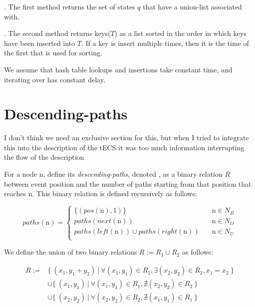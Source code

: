 . The first method returns the set of states $q$ that have a union-list associated with.

. The second method returns keys($T$) as a list sorted in the order in which keys have been inserted into $T$. If a key is insert multiple times, then it is the time of the first that is used for sorting.

We assume that hash table lookups and insertions take constant time, and iterating over has constant delay.

{\color{Added}
\section{Descending-paths}\label{sec:desc-path}

{\color{Comment} I don't think we need an exclusive section for this, but when I tried to integrate this into the description of the tECS it was too much information interrupting the flow of the description}

For a node \textrm{n}, define its \emph{descending-paths}, denoted , as a binary relation $R$ between event position and the number of paths starting from that position that reaches \textrm{n}. This binary relation is defined recursively as follows:

\[
paths(\textrm{n}) =
\begin{cases}
  \{(pos(\textrm{n}), 1)\} &\quad \textrm{n} \in N_{B}  \\
  paths(next(\textrm{n}))  &\quad \textrm{n} \in N_{O}  \\
  paths(left(\textrm{n})) \cup paths(right(\textrm{n})) &\quad \textrm{n} \in N_{U}  \\
\end{cases}
\]

We define the union of two binary relations $R := R_{1} \cup R_{2}$ as follows:

\begin{align*}
  R := & \{ \ (x_{1}, y_{1} + y_{2}) \ | \ \forall (x_{1}, y_{1}) \in R_{1}, \exists (x_{2}, y_{2}) \in R_{2}, x_{1} = x_{2} \ \} \\
       & \cup \{ \ (x_{1}, y_{1}) \ | \ \forall (x_{1}, y_{1}) \in R_{1}, \nexists (x_{2}, y_{2}) \in R_{2} \ \} \\
       & \cup \{ \ (x_{2}, y_{2}) \ | \ \forall (x_{2}, y_{2}) \in R_{2}, \nexists (x_{1}, y_{1}) \in R_{1} \ \}
\end{align*}

}
